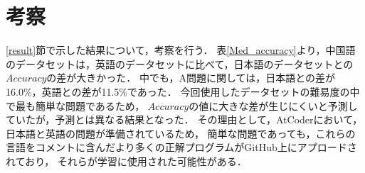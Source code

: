 \section{考察\label{consideration}}
  \ref{result}節で示した結果について，考察を行う．
  表\ref{Med_accuracy}より，中国語のデータセットは，英語のデータセットに比べて，日本語のデータセットとの$Accuracy$の差が大きかった．
  中でも，A問題に関しては，日本語との差が16.0\%，英語との差が11.5\%であった．
  今回使用したデータセットの難易度の中で最も簡単な問題であるため，
  $Accuracy$の値に大きな差が生じにくいと予測していたが，予測とは異なる結果となった．
  その理由として，AtCoder\cite{AtCoder}において，日本語と英語の問題が準備されているため，
  簡単な問題であっても，これらの言語をコメントに含んだより多くの正解プログラムがGitHub上にアプロードされており，
  それらが学習に使用された可能性がある．
  